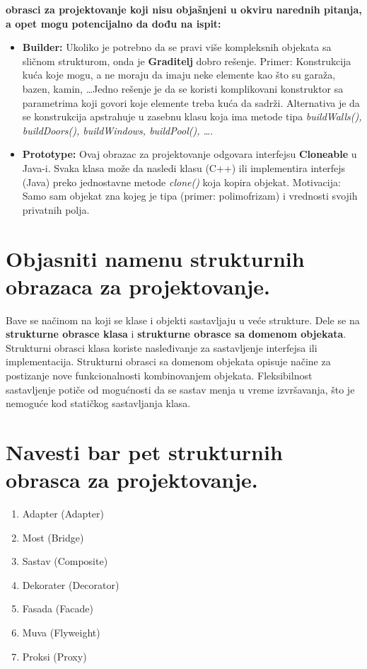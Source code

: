 \documentclass[a4paper]{article}
\begin{document}
  \textbf{obrasci za projektovanje koji nisu objašnjeni u okviru narednih pitanja, a opet mogu potencijalno da
          dođu na ispit:}
  \begin{itemize}
    \item \textbf{Builder:} Ukoliko je potrebno da se pravi više kompleksnih objekata sa sličnom strukturom, onda je
          \textbf{Graditelj} dobro rešenje. Primer: Konstrukcija kuća koje mogu, a ne moraju da imaju neke elemente
          kao što su garaža, bazen, kamin, \dots Jedno rešenje je da se koristi komplikovani konstruktor sa parametrima
          koji govori koje elemente treba kuća da sadrži. Alternativa je da se konstrukcija apstrahuje u zasebnu klasu
          koja ima metode tipa \textit{buildWalls(), buildDoors(), buildWindows, buildPool(), \dots}.
    \item \textbf{Prototype:} Ovaj obrazac za projektovanje odgovara interfejsu \textbf{Cloneable} u Java-i. Svaka
          klasa može da nasledi klasu (C++) ili implementira interfejs (Java) preko jednostavne metode \textit{clone()}
          koja kopira objekat. Motivacija: Samo sam objekat zna kojeg je tipa (primer: polimofrizam) i vrednosti
          svojih privatnih polja.
  \end{itemize}

\section{Objasniti namenu strukturnih obrazaca za projektovanje.}
  Bave se načinom na koji se klase i objekti sastavljaju u veće strukture. Dele se na 
  \textbf{strukturne obrasce klasa} i \textbf{strukturne obrasce sa domenom objekata}.
  Strukturni obrasci klasa koriste nasleđivanje za sastavljenje interfejsa ili
  implementacija. Strukturni obrasci sa domenom objekata opisuje načine za postizanje nove
  funkcionalnosti kombinovanjem objekata. Fleksibilnost sastavljenje potiče od mogućnosti 
  da se sastav menja u vreme izvršavanja, što je nemoguće kod statičkog sastavljanja klasa.

\section{Navesti bar pet strukturnih obrasca za projektovanje.}
  \begin{enumerate}
    \item Adapter (Adapter)
    \item Most (Bridge)
    \item Sastav (Composite)
    \item Dekorater (Decorator)
    \item Fasada (Facade)
    \item Muva (Flyweight)
    \item Proksi (Proxy)
  \end{enumerate}
\end{document}
